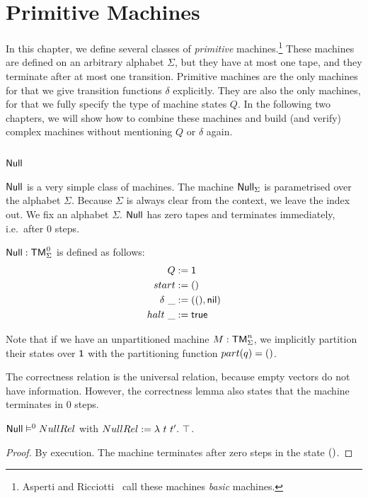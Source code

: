 \chapter{Primitive Machines}
\label{chap:basic}

In this chapter, we define several classes of \textit{primitive} machines.\footnote{Asperti and Ricciotti~\cite{asperti2015} call these machines
  \textit{basic} machines.}  These machines are defined on an arbitrary alphabet $\Sigma$, but they have at most one tape, and they terminate after at
most one transition.  Primitive machines are the only machines for that we give transition functions $\delta$ explicitly.  They are also the only
machines, for that we fully specify the type of machine states $Q$.  In the following two chapters, we will show how to combine these machines and
build (and verify) complex machines without mentioning $Q$ or $\delta$ again.


\section{$\MS{Null}$}
\label{sec:Null}



$\MS{Null}$ is a very simple class of machines.  The machine $\mathsf{Null}_\Sigma$ is parametrised over the alphabet $\Sigma$.  Because $\Sigma$ is
always clear from the context, we leave the index out.  We fix an alphabet $\Sigma$.  $\MS{Null}$ has zero tapes and terminates immediately, i.e.\
after $0$ steps.

\begin{definition}[$\MS{Null}$][Null]
  \label{def:Null}
  $\MS{Null} : \TM_\Sigma^{\mkern+1mu 0}$ is defined as follows:
  \begin{align*}
    Q          &:= \mathsf{1} \\
    start      &:= \mathsf{()} \\
    \delta ~\_ &:= (\mathsf{()}, \mathsf{nil}) \\
    halt   ~\_ &:= \mathsf{true}
  \end{align*}
\end{definition}
Note that if we have an unpartitioned machine $M:\mathsf{TM}_\Sigma^n$, we implicitly partition their states over $\mathsf{1}$ with the partitioning function
$part(q)=\mathsf{()}$.

The correctness relation is the universal relation, because empty vectors do not have information.  However, the correctness lemma also states that
the machine terminates in $0$ steps.
\begin{lemma}
  \label{lem:Null_Sem} $\mathsf{Null} \mathrel{\vDash^{0}} NullRel$ with $NullRel := \lambda~t~t'.~ \top$.
\end{lemma}
\begin{proof}
  By execution.  The machine terminates after zero steps in the state $\mathsf{()}$.
\end{proof}

